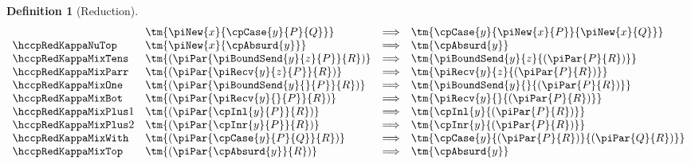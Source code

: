 \documentclass[submission,copyright,creativecommons]{eptcs}
\newtheorem{definition}{Definition}
\begin{document}
\begin{definition}[Reduction]
\begin{gather*}
\begin{array}{llcll}
      & \tm{\piNew{x}{\cpCase{y}{P}{Q}}}
      & \Longrightarrow
      & \tm{\cpCase{y}{\piNew{x}{P}}{\piNew{x}{Q}}}
      \\
      \hccpRedKappaNuTop
      & \tm{\piNew{x}{\cpAbsurd{y}}}
      & \Longrightarrow
      & \tm{\cpAbsurd{y}}
      \\
      \hccpRedKappaMixTens
      & \tm{(\piPar{\piBoundSend{y}{z}{P}}{R})}
      & \Longrightarrow
      & \tm{\piBoundSend{y}{z}{(\piPar{P}{R})}}
      \\
      \hccpRedKappaMixParr
      & \tm{(\piPar{\piRecv{y}{z}{P}}{R})}
      & \Longrightarrow
      & \tm{\piRecv{y}{z}{(\piPar{P}{R})}}
      \\
      \hccpRedKappaMixOne
      & \tm{(\piPar{\piBoundSend{y}{}{P}}{R})}
      & \Longrightarrow
      & \tm{\piBoundSend{y}{}{(\piPar{P}{R})}}
      \\
      \hccpRedKappaMixBot
      & \tm{(\piPar{\piRecv{y}{}{P}}{R})}
      & \Longrightarrow
      & \tm{\piRecv{y}{}{(\piPar{P}{R})}}
      \\
      \hccpRedKappaMixPlus1
      & \tm{(\piPar{\cpInl{y}{P}}{R})}
      & \Longrightarrow
      & \tm{\cpInl{y}{(\piPar{P}{R})}}
      \\
      \hccpRedKappaMixPlus2
      & \tm{(\piPar{\cpInr{y}{P}}{R})}
      & \Longrightarrow
      & \tm{\cpInr{y}{(\piPar{P}{R})}}
      \\
      \hccpRedKappaMixWith
      & \tm{(\piPar{\cpCase{y}{P}{Q}}{R})}
      & \Longrightarrow
      & \tm{\cpCase{y}{(\piPar{P}{R})}{(\piPar{Q}{R})}}
      \\
      \hccpRedKappaMixTop
      & \tm{(\piPar{\cpAbsurd{y}}{R})}
      & \Longrightarrow
      & \tm{\cpAbsurd{y}}
    \end{array}
  \end{gather*}
  \begin{center}
    \begin{prooftree*}
      \SYM{\hccpRedGammaNew}
    \end{prooftree*}
    \begin{prooftree*}
      \SYM{\hccpRedGammaMix}
    \end{prooftree*}
    \begin{prooftree*}
      \SYM{\hccpRedGammaEquiv}
    \end{prooftree*}
  \end{center}
\end{definition}
\end{document}
